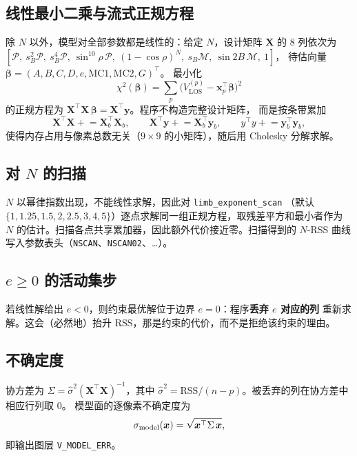 \documentclass[11pt,a4paper]{ctexart}
\newcommand{\code}[1]{\texttt{\small #1}}
\newcommand{\vlos}{V_{\mathrm{LOS}}}
\newcommand{\Proj}{\mathcal{P}}
\newcommand{\Merid}{\mathcal{M}}
\begin{document}
\subsection{线性最小二乘与流式正规方程}
除 $N$ 以外，模型对全部参数都是线性的：给定 $N$，设计矩阵 $\bm{X}$ 的 8 列依次为
$[\Proj,\ s_B^2\Proj,\ s_B^4\Proj,\ \sin^{10}\!\rho\,\Proj,\ (1-\cos\rho)^N,\
s_B\Merid,\ \sin2B\,\Merid,\ 1]$，
待估向量 $\bm\beta = (A,B,C,D,e,\mathrm{MC1},\mathrm{MC2},G)^\top$。
最小化
\begin{equation}
  \chi^2(\bm\beta) = \sum_{p}\bigl(\vlos^{(p)} - \bm{x}_p^\top\bm\beta\bigr)^2
\end{equation}
的正规方程为 $\bm{X}^\top\bm{X}\,\bm\beta = \bm{X}^\top\bm{y}$。程序不构造完整设计矩阵，
而是按条带累加
\begin{equation}
  \bm{X}^\top\bm{X} \mathrel{+}= \bm{X}_b^\top\bm{X}_b,\qquad
  \bm{X}^\top\bm{y} \mathrel{+}= \bm{X}_b^\top\bm{y}_b,\qquad
  y^\top y \mathrel{+}= \bm{y}_b^\top\bm{y}_b ,
\end{equation}
使得内存占用与像素总数无关（$9\times9$ 的小矩阵），随后用 Cholesky 分解求解。

\subsection{对 $N$ 的扫描}
$N$ 以幂律指数出现，不能线性求解，因此对 \code{limb\_exponent\_scan}
（默认 $\{1,1.25,1.5,2,2.5,3,4,5\}$）逐点求解同一组正规方程，取残差平方和最小者作为
$N$ 的估计。扫描各点共享累加器，因此额外代价接近零。扫描得到的 $N$-RSS 曲线
写入参数表头（\code{NSCAN}、\code{NSCAN02}、\dots）。

\subsection{$e\ge0$ 的活动集步}
若线性解给出 $e<0$，则约束最优解位于边界 $e=0$：程序\textbf{丢弃 $e$ 对应的列}
重新求解。这会（必然地）抬升 RSS，那是约束的代价，而不是拒绝该约束的理由。

\subsection{不确定度}
协方差为 $\Sigma = \hat\sigma^2 (\bm{X}^\top\bm{X})^{-1}$，其中
$\hat\sigma^2 = \mathrm{RSS}/(n-p)$。被丢弃的列在协方差中相应行列取 0。
模型面的逐像素不确定度为
\begin{equation}
  \sigma_{\rm model}(\bm{x}) = \sqrt{\bm{x}^\top \Sigma\, \bm{x}} ,
\end{equation}
即输出图层 \code{V\_MODEL\_ERR}。
\end{document}
